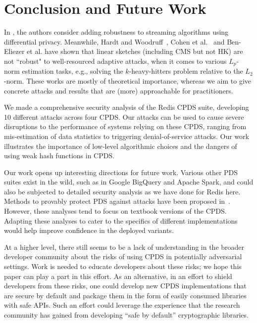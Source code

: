 \chapter{Conclusion and Future Work}


In \cite{HassidimKMMS20}, the authors consider adding robustness to streaming algorithms using differential privacy.
Meanwhile, Hardt and Woodruff~\cite{hardt2013}, Cohen et al.~\cite{cohen2022robust} and Ben-Eliezer et al.\cite{BenEliezer2022} have shown that linear sketches (including CMS but not HK) are not ``robust" to well-resourced adaptive attacks, when it comes to various $L_p$-norm estimation tasks, e.g., solving the $k$-heavy-hitters problem relative to the $L_2$-norm.  
These works are mostly of theoretical importance, whereas we aim to give concrete  attacks and results that are (more) approachable for practitioners.

We made a comprehensive security analysis of the Redis CPDS suite, developing 10 different attacks across four CPDS. 
Our attacks can be used to cause severe disruptions to the performance of systems relying on these CPDS, ranging from mis-estimation of data statistics to triggering denial-of-service attacks. 
Our work illustrates the importance of low-level algorithmic choices and the dangers of using weak hash functions in CPDS. 

Our work opens up interesting directions for future work. Various other PDS suites exist in the wild, such as in Google BigQuery and Apache Spark, and could also be subjected to detailed security analysis as we have done for Redis here. 
Methods to provably protect PDS against attacks have been proposed in~\cite{NaorY15,clayton2019,FPUV22,PatersonR22}. However, these analyses tend to focus on textbook versions of the CPDS. 
Adapting these analyses to cater to the specifics of different implementations would help improve confidence in the deployed variants.

At a higher level, there still seems to be a lack of understanding  in the broader developer community about the risks of using CPDS in potentially adversarial settings. 
Work is needed to educate developers about these risks; we hope this paper can play a part in this effort. 
As an alternative, in an effort to shield developers from these risks, one could develop new CPDS implementations that are secure by default and package them in the form of easily consumed libraries with safe APIs. Such an effort could leverage the experience that the research community has gained from developing ``safe by default'' cryptographic libraries.

